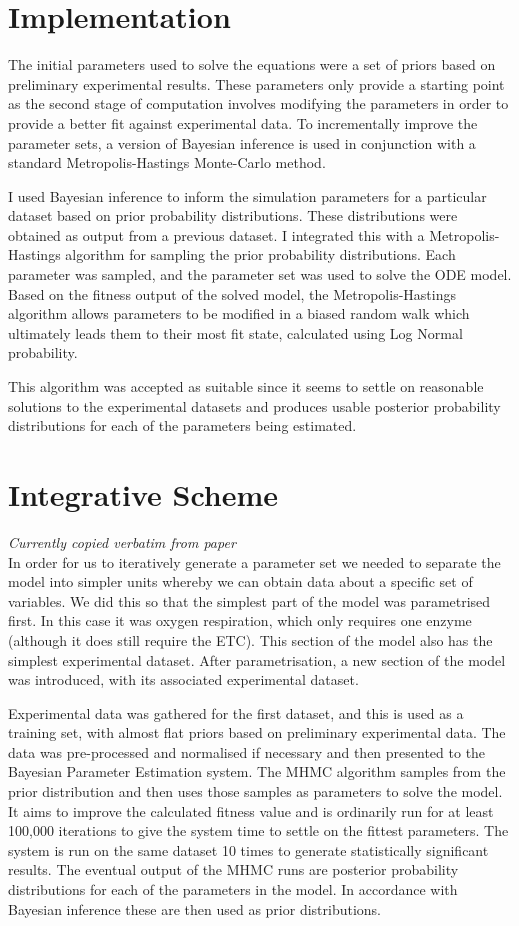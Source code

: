 \section{Implementation}
The initial parameters used to solve the equations were a set of priors based on preliminary experimental results. These parameters only provide a starting point as the second stage of computation involves modifying the parameters in order to provide a better fit against experimental data. To incrementally improve the parameter sets, a version of Bayesian inference is used in conjunction with a standard Metropolis-Hastings Monte-Carlo method.

I used Bayesian inference to inform the simulation parameters for a particular dataset based on prior probability distributions. These distributions were obtained as output from a previous dataset. I integrated this with a Metropolis-Hastings algorithm for sampling the prior probability distributions. Each parameter was sampled, and the parameter set was used to solve the ODE model. Based on the fitness output of the solved model, the Metropolis-Hastings algorithm allows parameters to be modified in a biased random walk which ultimately leads them to their most fit state, calculated using Log Normal probability.

This algorithm was accepted as suitable since it seems to settle on reasonable solutions to the experimental datasets and produces usable posterior probability distributions for each of the parameters being estimated.

\section{Integrative Scheme}
\emph{Currently copied verbatim from paper}\\
In order for us to iteratively generate a parameter set we needed to separate the model into simpler units whereby we can obtain data about a specific set of variables. We did this so that the simplest part of the model was parametrised first. In this case it was oxygen respiration, which only requires one enzyme (although it does still require the ETC). This section of the model also has the simplest experimental dataset. After parametrisation, a new section of the model was introduced, with its associated experimental dataset.

Experimental data was gathered for the first dataset, and this is used as a training set, with almost flat priors based on preliminary experimental data. The data was pre-processed and normalised if necessary and then presented to the Bayesian Parameter Estimation system. The MHMC algorithm samples from the prior distribution and then uses those samples as parameters to solve the model. It aims to improve the calculated fitness value and is ordinarily run for at least 100,000 iterations to give the system time to settle on the fittest parameters. The system is run on the same dataset 10 times to generate statistically significant results. The eventual output of the MHMC runs are posterior probability distributions for each of the parameters in the model. In accordance with Bayesian inference these are then used as prior distributions.


